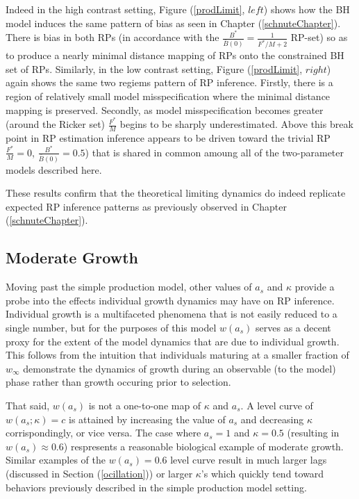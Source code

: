 Indeed in the high contrast setting, Figure (\ref{prodLimit}, $left$) shows
how the BH model induces the same pattern of bias as seen in Chapter
(\ref{schnuteChapter}). There is bias in both RPs (in accordance with the
$\frac{B^*}{\bar B(0)}=\frac{1}{F^*/M+2}$ RP-set) so as to produce a nearly
minimal distance mapping of RPs onto the constrained BH set of RPs.
Similarly, in the low contrast setting, Figure (\ref{prodLimit}, $right$) again
shows the same two regiems pattern of RP inference. Firstly, there is a region of
relatively small model misspecification where the minimal distance mapping
is preserved. Secondly, as model misspecification becomes greater (around the
Ricker set) $\frac{F^*}{M}$ begins to be sharply underestimated. Above this
break point in RP estimation inference appears to be driven toward the trivial RP
$\frac{F^*}{M}=0$, $\frac{B^*}{\bar B(0)}=0.5$) that is shared in common
amoung all of the two-parameter models described here.

%
These results confirm that the theoretical limiting dynamics do 
indeed replicate expected RP inference patterns as previously observed in 
Chapter (\ref{schnuteChapter}).

%
\subsection{Moderate Growth}

%
Moving past the simple production model, other values of $a_s$ and $\kappa$ 
provide a probe into the effects individual growth dynamics may have on RP 
inference.
%
Individual growth is a multifaceted phenomena that is not easily reduced
to a single number, but for the purposes of this model $w(a_s)$ serves as a decent 
proxy for the extent of the model dynamics that are due to individual growth. %
%
This follows from the intuition that individuals maturing at a smaller fraction
of $w_\infty$ demonstrate the dynamics of growth during an observable (to the model) %
phase rather than growth occuring prior to selection. %

%
That said, $w(a_s)$ is not a one-to-one map of $\kappa$ and $a_s$.
%
A level curve of $w(a_s; \kappa)=c$ is attained by increasing the value of $a_s$
and decreasing $\kappa$ corrispondingly, or vice versa.
%
The case where $a_s=1$ and $\kappa=0.5$ (resulting in $w(a_s)\approx0.6$)
respresents a reasonable biological example of moderate growth.
%
Similar examples of the $w(a_s)=0.6$ level curve result in much larger lags
(discussed in Section (\ref{ocillation})) or larger $\kappa$'s which quickly
tend toward behaviors previously described in the simple production model
setting.

